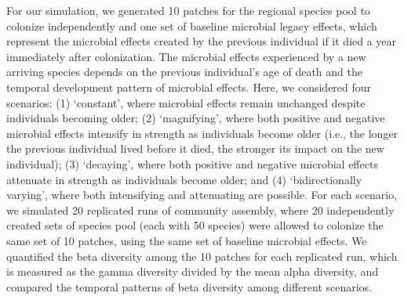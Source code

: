 For our simulation, we generated 10 patches for the regional species pool to colonize independently and one set of baseline microbial legacy effects, which represent the microbial effects created by the previous individual if it died a year immediately after colonization.
The microbial effects experienced by a new arriving species depends on the previous individual's age of death and the temporal development pattern of microbial effects.
Here, we considered four scenarios: (1) `constant', where microbial effects remain unchanged despite individuals becoming older; (2) `magnifying', where both positive and negative microbial effects intensify in strength as individuals become older (i.e., the longer the previous individual lived before it died, the stronger its impact on the new individual); (3) `decaying', where both positive and negative microbial effects attenuate in strength as individuals become older; and (4) `bidirectionally varying', where both intensifying and attenuating are possible. 
For each scenario, we simulated 20 replicated runs of community assembly, where 20 independently created sets of species pool (each with 50 species) were allowed to colonize the same set of 10 patches, using the same set of baseline microbial effects. 
We quantified the beta diversity among the 10 patches for each replicated run, which is measured as the gamma diversity divided by the mean alpha diversity, and compared the temporal patterns of beta diversity among different scenarios.
\par

